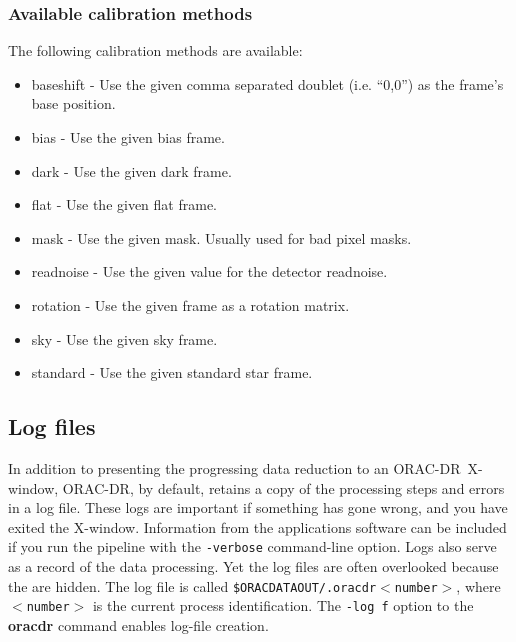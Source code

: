 \documentclass[twoside,11pt]{article}
\newcommand{\xlabel}[1]{}
\renewcommand{\_}{\texttt{\symbol{95}}}
\newcommand{\ORACDR}{{\footnotesize ORAC-DR}}
\begin{document}
\subsubsection{\xlabel{available_calib}Available calibration methods\label{available_calib}}

The following calibration methods are available:

\begin{itemize}

\item baseshift - Use the given comma separated doublet (i.e. ``0,0'') as the
frame's base position.

\item bias - Use the given bias frame.

\item dark - Use the given dark frame.

\item flat - Use the given flat frame.

\item mask - Use the given mask. Usually used for bad pixel masks.

\item readnoise - Use the given value for the detector readnoise.

\item rotation - Use the given frame as a rotation matrix.

\item sky - Use the given sky frame.

\item standard - Use the given standard star frame.

\end{itemize}

\subsection{\xlabel{log_files}Log files\label{log_files}}

In addition to presenting the progressing data reduction to an
\ORACDR\ X-window, \ORACDR, by default, retains a copy of the
processing steps and errors in a log file.  These logs are important
if something has gone wrong, and you have exited the X-window.
Information from the applications software can be included if you run
the pipeline with the {\tt -verbose} command-line option.  Logs also
serve as a record of the data processing.  Yet the log files are often
overlooked because the are hidden.  The log file is called
{\tt\$ORAC\_DATA\_OUT/.oracdr\_$<$number$>$}, where {\tt$<$number$>$}
is the current process identification.  The {\tt -log f} option to the
{\bf oracdr} command enables log-file creation.
\end{document}
